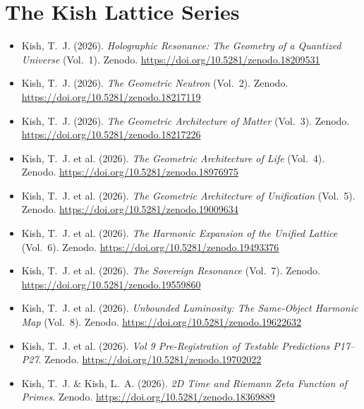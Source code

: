 \documentclass[11pt, letterpaper, openany]{book}
\begin{document}
\section*{The Kish Lattice Series}
\begin{itemize}
    \item Kish, T.~J. (2026). \textit{Holographic Resonance: The Geometry of a Quantized Universe} (Vol.~1). Zenodo. \url{https://doi.org/10.5281/zenodo.18209531}
    \item Kish, T.~J. (2026). \textit{The Geometric Neutron} (Vol.~2). Zenodo. \url{https://doi.org/10.5281/zenodo.18217119}
    \item Kish, T.~J. (2026). \textit{The Geometric Architecture of Matter} (Vol.~3). Zenodo. \url{https://doi.org/10.5281/zenodo.18217226}
    \item Kish, T.~J. et al. (2026). \textit{The Geometric Architecture of Life} (Vol.~4). Zenodo. \url{https://doi.org/10.5281/zenodo.18976975}
    \item Kish, T.~J. et al. (2026). \textit{The Geometric Architecture of Unification} (Vol.~5). Zenodo. \url{https://doi.org/10.5281/zenodo.19009634}
    \item Kish, T.~J. et al. (2026). \textit{The Harmonic Expansion of the Unified Lattice} (Vol.~6). Zenodo. \url{https://doi.org/10.5281/zenodo.19493376}
    \item Kish, T.~J. et al. (2026). \textit{The Sovereign Resonance} (Vol.~7). Zenodo. \url{https://doi.org/10.5281/zenodo.19559860}
    \item Kish, T.~J. et al. (2026). \textit{Unbounded Luminosity: The Same-Object Harmonic Map} (Vol.~8). Zenodo. \url{https://doi.org/10.5281/zenodo.19622632}
    \item Kish, T.~J. et al. (2026). \textit{Vol 9 Pre-Registration of Testable Predictions P17--P27}. Zenodo. \url{https://doi.org/10.5281/zenodo.19702022}
    \item Kish, T.~J. \& Kish, L.~A. (2026). \textit{2D Time and Riemann Zeta Function of Primes}. Zenodo. \url{https://doi.org/10.5281/zenodo.18369889}
\end{itemize}
\end{document}
